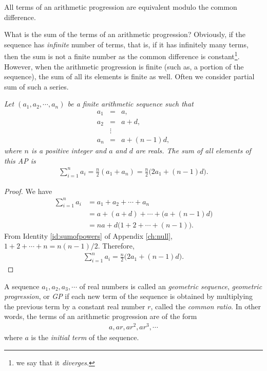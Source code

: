 \documentclass{subfile}
\begin{document}
	\begin{corollary}
		All terms of an arithmetic progression are equivalent modulo the common difference.
	\end{corollary}
What is the sum of the terms of an arithmetic progression? Obviously, if the sequence has \textit{infinite} number of terms, that is, if it has infinitely many terms, then the sum is not a finite number as the common difference is constant\footnote{we say that it \textit{diverges}.}. However, when the arithmetic progression is finite (such as, a portion of the sequence), the sum of all its elements is finite as well. Often we consider partial sum of such a series.
	\begin{theorem}\slshape
		Let $(a_1,a_2,\cdots,a_n)$ be a finite arithmetic sequence such that
			\begin{eqnarray*}
				a_1 & = & a,\\
				a_2 & = & a+d,\\
					& \vdots &\\
				a_n & = & a+ (n-1)d,
			\end{eqnarray*}
		where $n$ is a positive integer and $a$ and $d$ are reals. The sum of all elements of this AP is
			\begin{align*}
				\sum_{i=1}^{n} a_i = \frac{n}{2} \left(a_1+a_n\right) = \frac{n}{2} \big(2a_1 + (n-1)d\big).
			\end{align*}
	\end{theorem}
	
	\begin{proof}
		We have
			\begin{align*}
				\sum_{i=1}^{n} a_i &= a_1 + a_2 + \cdots + a_n \\
								   &= a + (a+d) + \cdots + \Big(a+ (n-1)d\Big)\\
								   &= na + d\Big(1+2+\cdots+ (n-1)\Big).
			\end{align*}
		From Identity \ref{id:sumofpowers} of Appendix \eqref{ch:null}, $1+2+\cdots+n = n(n-1)/2$. Therefore,
			\begin{align*}
				\sum_{i=1}^{n} a_i = \frac{n}{2} \big(2a_1 + (n-1)d\big).
			\end{align*}
	\end{proof}
	
	\begin{definition}
		A sequence $a_1, a_2, a_3, \cdots$ of real numbers is called an \textit{geometric sequence}, \textit{geometric progression}, or \textit{GP} if each new term of the sequence is obtained by multiplying the previous term by a constant real number $r$, called the \textit{common ratio}. In other words, the terms of an arithmetic progression are of the form
			\begin{align*}
				a, ar, ar^2, ar^3, \cdots
			\end{align*}
		where $a$ is the \textit{initial term} of the sequence.
	\end{definition}
	
\end{document}
